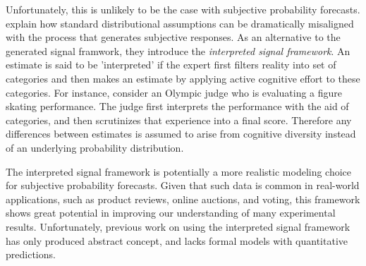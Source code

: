 \documentclass[11pt,twoside]{article}
\begin{document}
Unfortunately, this is unlikely to be the case with subjective
probability forecasts. \cite{hong2009interpreted} explain how standard
distributional assumptions can be dramatically misaligned with the
process that generates subjective responses. As an alternative to the
generated signal framwork, they introduce the \textit{interpreted
signal framework}. An estimate is said to be 'interpreted' if the expert
first filters reality into set of categories and then makes an
estimate by applying active cognitive effort to these categories. For
instance, consider an Olympic judge who is evaluating a figure skating
performance. The judge first interprets the performance with the aid
of categories, and then scrutinizes that experience into a final
score. Therefore any differences between estimates is assumed to arise
from cognitive diversity instead of an underlying probability
distribution.



The interpreted signal framework is potentially  a more realistic modeling choice
for subjective probability forecasts. Given that such data is
common in real-world applications, such as product reviews,
online auctions, and voting, this framework shows great potential in
improving our understanding of many experimental
results. Unfortunately, previous work  on using the interpreted signal framework has only produced
abstract concept, and lacks formal models with quantitative predictions.
\end{document}
